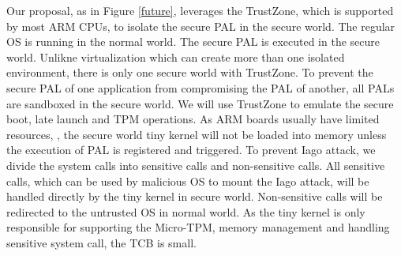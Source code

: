 Our proposal, as in Figure \ref{future}, leverages the TrustZone, which is supported by most ARM CPUs, to
isolate the secure PAL in the secure world. The regular OS is running in the
normal world. The secure PAL is executed in the secure world. Unlikne
virtualization which can create more than one isolated environment, there is
only one secure world with TrustZone. To prevent the secure PAL of one
application from compromising the PAL of another, all PALs are sandboxed in the
secure world. We will use TrustZone to emulate the secure boot, late launch and
TPM operations. As ARM boards usually have limited resources, , the secure world
tiny kernel will not be loaded into memory unless the execution of PAL is
registered and triggered. To prevent Iago attack, we divide the system calls
into sensitive calls and non-sensitive calls. All sensitive calls, which can be
used by malicious OS to mount the Iago attack, will be handled directly by the
tiny kernel in secure world. Non-sensitive calls will be redirected to the
untrusted OS in normal world. As the tiny kernel is only responsible for
supporting the Micro-TPM, memory management and handling sensitive system call,
the TCB is small.  
